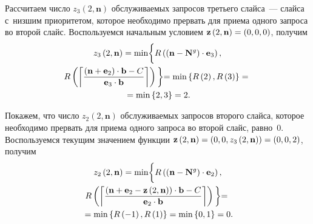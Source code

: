 \begin{multicols}{2}
\vspace*{6pt}

\addtocounter{table}{1}


Рассчитаем число $z_3\left(2,\mathbf{n}\right)$ об\-слу\-жи\-ва\-емых запросов третьего 
слайса~--- слайса с~низшим приоритетом, которое необходимо прервать для приема 
одного запроса во второй слайс. Воспользуемся начальным условием 
$\mathbf{z}\left(2,\mathbf{n}\right)\hm=\left(0,0,0\right)$, получим
\begin{multline*}
z_3\left(2,\mathbf{n}\right) = \min
\biggl\{
R \left(\left(\mathbf{n}-\mathbf{N}^{{g}}\right) \cdot \mathbf{e}_3\right), 
\\
R \left(\left\lceil \displaystyle\frac{\displaystyle \left(\mathbf{n}+\mathbf{e}_2 \right)\cdot\mathbf{b} - 
C\mathstrut}{\displaystyle \mathbf{e}_3\cdot\mathbf{b}\mathstrut} \right\rceil\right)
\biggl\} =
\min \left\{ R \left(2\right),R \left(3\right) \right\} ={} \\
{}= \min \left\{2,3\right\} = 2.
\end{multline*}

Покажем, что число $z_2\left(2,\mathbf{n}\right)$ об\-слу\-жи\-ва\-емых запросов второго 
слайса, которое необходимо прервать для приема одного запроса во второй слайс, 
равно~$0$. Воспользуемся текущим значением функции 
$\mathbf{z}\left(2,\mathbf{n}\right)\hm=\left(0,0,z_3\left(2,\mathbf{n}\right)\right)=\left(0,0,2\right)$, получим
\begin{multline*}
z_2\left(2,\mathbf{n}\right) = \min
\biggl\{
R \left(\left(\mathbf{n}-\mathbf{N}^{{g}}\right) \cdot \mathbf{e}_2\right), 
\\
R \left(\left\lceil \displaystyle\frac{\displaystyle \left(\mathbf{n}+\mathbf{e}_2 - 
\mathbf{z}\left(2,\mathbf{n}\right) \right)\cdot\mathbf{b} - 
C\mathstrut}{\displaystyle \mathbf{e}_2\cdot\mathbf{b}\mathstrut} \right\rceil\right)
\biggl\} ={} \\
{}= \min \left\{R \left(-1\right),R \left(1\right) \right\} = \min 
\left\{0,1\right\} = 0.
\end{multline*}


\end{multicols}
